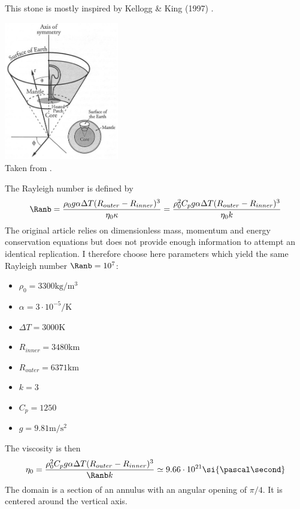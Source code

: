 

This stone is mostly inspired by Kellogg \& King (1997) \cite{keki97}. 

\begin{center}
\includegraphics[width=5cm]{python_codes/fieldstone_106/images/keki97a}\\
{\captionfont Taken from \cite{keki97}.}
\end{center}
The Rayleigh number is defined by
\[
\Ranb 
= \frac{\rho_0 g \alpha \Delta T (R_{outer}-R_{inner})^3}{\eta_0 \kappa}
=\frac{\rho_0^2 C_p g \alpha \Delta T (R_{outer}-R_{inner})^3}{\eta_0 k}
\]
The original article relies on dimensionless mass, momentum and energy conservation equations
but does not provide enough information to attempt an identical replication. I therefore 
choose here parameters which yield the same Rayleigh number $\Ranb=10^7$:
\begin{itemize}
\item $\rho_0=3300\si{\kg\per\cubic\metre}$
\item $\alpha=3\cdot 10^{-5} \si{\per\kelvin}$
\item $\Delta T=3000\si{\kelvin}$
\item $R_{inner}=3480\si{\km}$
\item $R_{outer}=6371\si{\km}$
\item $k=3$
\item $C_p=1250$
\item $g=9.81\si{\metre\per\square\second}$
\end{itemize}
The viscosity is then 
\[
\eta_0
=\frac{\rho_0^2 C_p g \alpha \Delta T (R_{outer}-R_{inner})^3}{\Ranb k}
\simeq 9.66 \cdot 10^{21}\si{\pascal\second}
\]
The domain is a section of an annulus with an angular opening of $\pi/4$. 
It is centered around the vertical axis. 



